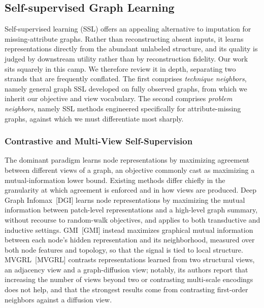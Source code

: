 \subsection{Self-supervised Graph Learning}


Self-supervised learning (SSL) offers an appealing alternative to imputation for missing-attribute graphs. Rather than reconstructing absent inputs, it learns representations directly from the abundant unlabeled structure, and its quality is judged by downstream utility rather than by reconstruction fidelity. Our work sits squarely in this camp. We therefore review it in depth, separating two strands that are frequently conflated. The first comprises \emph{technique neighbors}, namely general graph SSL developed on fully observed graphs, from which we inherit our objective and view vocabulary. The second comprises \emph{problem neighbors}, namely SSL methods engineered specifically for attribute-missing graphs, against which we must differentiate most sharply.

\subsubsection{Contrastive and Multi-View Self-Supervision}
\label{sec:related-contrastive}

The dominant paradigm learns node representations by maximizing agreement between different views of a graph, an objective commonly cast as maximizing a mutual-information lower bound. Existing methods differ chiefly in the granularity at which agreement is enforced and in how views are produced. Deep Graph Infomax~[DGI] learns node representations by maximizing the mutual information between patch-level representations and a high-level graph summary, without recourse to random-walk objectives, and applies to both transductive and inductive settings. GMI~[GMI] instead maximizes graphical mutual information between each node's hidden representation and its neighborhood, measured over both node features and topology, so that the signal is tied to local structure. MVGRL~[MVGRL] contrasts representations learned from two structural views, an adjacency view and a graph-diffusion view; notably, its authors report that increasing the number of views beyond two or contrasting multi-scale encodings does not help, and that the strongest results come from contrasting first-order neighbors against a diffusion view.

